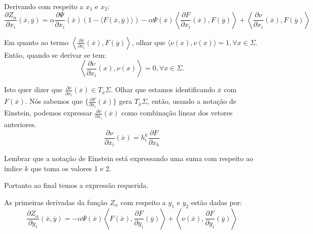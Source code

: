 \begin{demonstracao}
	Derivando com respeito a $x_1$ e $x_2$:
	\begin{equation*}
		\frac{\partial Z_{\alpha}}{\partial x_i} (\overline{x}, \overline{y}) = \alpha \frac{\partial \Psi}{\partial x_i}(\overline{x}) (1 - \langle F(\overline{x}, \overline{y}) \rangle) - \alpha \Psi(\overline{x}) \left\langle \frac{\partial F}{\partial x_i}(\overline{x}), F(\overline{y}) \right\rangle + \left\langle \frac{\partial \nu}{\partial x_i}(\overline{x}), F(\overline{y}) \right\rangle
	\end{equation*}
	
	Em quanto ao termo $ \left\langle \frac{\partial \nu}{\partial x_i}(\overline{x}), F(\overline{y}) \right\rangle $, olhar que $\langle \nu(x), \nu(x) \rangle=1, \forall x \in \Sigma$. Então, quando se derivar se tem:
	\begin{equation*}
		\left\langle \frac{\partial \nu}{\partial x_i}(x), \nu(x) \right\rangle = 0, \forall x \in \Sigma.
	\end{equation*}
	
	Isto quer dizer que $\frac{\partial \nu}{\partial x_i}(\overline{x}) \in T_{\overline{x}} \Sigma$. Olhar que estamos identificando $\overline{x}$ com $F(\overline{x})$. Nós sabemos que $\{ \frac{\partial F}{\partial x_i}(\overline{x}) \}$ gera $T_{\overline{x}} \Sigma$, então, usando a notação de Einstein, podemos expressar $\frac{\partial \nu}{\partial x_i}(\overline{x})$ como combinação linear dos vetores anteriores.
	\begin{equation}\label{der_nu_x}
		\frac{\partial \nu}{\partial x_i} (\overline{x}) = h_i^k \frac{\partial F}{\partial x_k}
	\end{equation}
	
	Lembrar que a notação de Einstein está expressando uma suma com respeito ao índice $k$ que toma os valores 1 e 2.
	
	Portanto ao final temos a expressão requerida.
\end{demonstracao}

\begin{proposicao}
	As primeiras derivadas da função $Z_{\alpha}$ com respeito a $y_1$ e $y_2$ estão dadas por:
	\begin{equation*}
		\frac{\partial Z_{\alpha}}{\partial y_i} (\overline{x}, \overline{y}) = -\alpha \Psi(\overline{x}) \left\langle F(\overline{x}), \frac{\partial F}{\partial y_i} (\overline{y}) \right\rangle + \left\langle \nu(\overline{x}), \frac{\partial F}{\partial y_i}(\overline{y}) \right\rangle
	\end{equation*}
\end{proposicao}

